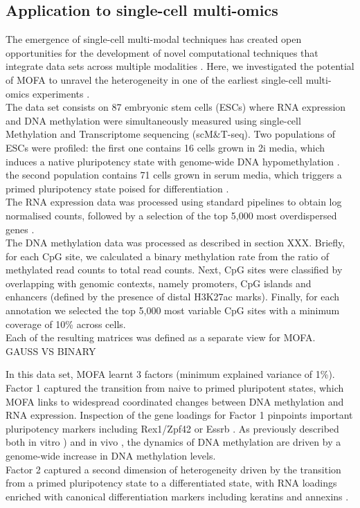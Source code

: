 

\subsection{Application to single-cell multi-omics} \label{section:mofa_scmt}
The emergence of single-cell multi-modal techniques has created open opportunities for the development of novel computational techniques that integrate data sets across multiple modalities \cite{Stuart2019,Colome-Tatche2018,Chappell2018}. Here, we investigated the potential of MOFA to unravel the heterogeneity in one of the earliest single-cell multi-omics experiments \cite{Angermueller2016}.\\
The data set consists on 87 embryonic stem cells (ESCs) where RNA expression and DNA methylation were simultaneously measured using single-cell Methylation and Transcriptome sequencing (scM\&T-seq). Two populations of ESCs were profiled: the first one contains 16 cells grown in 2i media, which induces a native pluripotency state with genome-wide DNA hypomethylation \cite{Ficz2013}. the second population contains 71 cells grown in serum media, which triggers a primed pluripotency state poised for differentiation \cite{Tosolini2016}.\\

The RNA expression data was processed using standard pipelines to obtain log normalised counts, followed by a selection of the top 5,000 most overdispersed genes \cite{Lun2016}.\\
The DNA methylation data was processed as described in section XXX. Briefly, for each CpG site, we calculated a binary methylation rate from the ratio of methylated read counts to total read counts. Next, CpG sites were classified by overlapping with genomic contexts, namely promoters, CpG islands and enhancers (defined by the presence of distal H3K27ac marks). Finally, for each annotation we selected the top 5,000 most variable CpG sites with a minimum coverage of 10\% across cells.\\
Each of the resulting matrices was defined as a separate view for MOFA.\\

GAUSS VS BINARY

In this data set, MOFA learnt 3 factors (minimum explained variance of 1\%). Factor 1 captured the transition from naive to primed pluripotent states, which MOFA links to widespread coordinated changes between DNA methylation and RNA expression. Inspection of the gene loadings for Factor 1 pinpoints important pluripotency markers including  Rex1/Zpf42 or Essrb \cite{Mohammed2017}. As previously described both in vitro \cite{Angermueller2016}) and in vivo \cite{Auclair2014}, the dynamics of DNA methylation are driven by a genome-wide increase in DNA methylation levels.\\
Factor 2 captured a second dimension of heterogeneity driven by the transition from a primed pluripotency state to a differentiated state, with RNA loadings enriched with canonical differentiation markers including keratins and annexins \cite{XX}.\\

